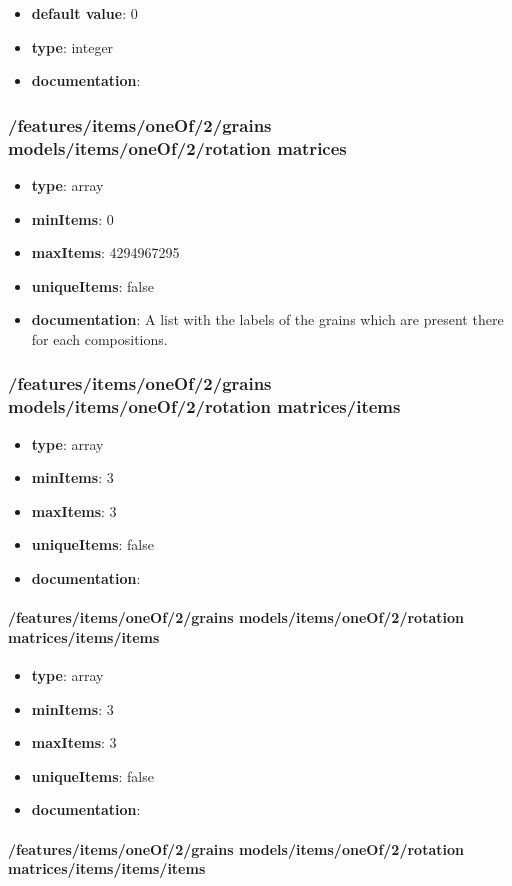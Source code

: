 \begin{itemize}\item {\bf default value}: 0
\item {\bf type}: integer
\item {\bf documentation}: 
\end{itemize}\subsubsection{/features/items/oneOf/2/grains models/items/oneOf/2/rotation matrices}
\begin{itemize}\item {\bf type}: array
\item {\bf minItems}: 0
\item {\bf maxItems}: 4294967295
\item {\bf uniqueItems}: false
\item {\bf documentation}: A list with the labels of the grains which are present there for each compositions.
\end{itemize}\subsubsection{/features/items/oneOf/2/grains models/items/oneOf/2/rotation matrices/items}
\begin{itemize}\item {\bf type}: array
\item {\bf minItems}: 3
\item {\bf maxItems}: 3
\item {\bf uniqueItems}: false
\item {\bf documentation}: 
\end{itemize}\paragraph{/features/items/oneOf/2/grains models/items/oneOf/2/rotation matrices/items/items}
\begin{itemize}\item {\bf type}: array
\item {\bf minItems}: 3
\item {\bf maxItems}: 3
\item {\bf uniqueItems}: false
\item {\bf documentation}: 
\end{itemize}\paragraph{/features/items/oneOf/2/grains models/items/oneOf/2/rotation matrices/items/items/items}
